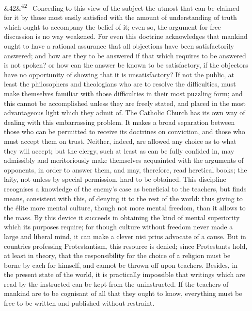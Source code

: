 \documentclass[12pt]{article}
\newcommand{\para}[1][]{\par\noindent\ifx&#1&\else\textsuperscript{\footnotesize #1}~\fi}
\begin{document}
\para[42] Conceding to this view of the subject the utmost that can be claimed for it by those most easily satisfied with the amount of understanding of truth which ought to accompany the belief of it; even so, the argument for free discussion is no way weakened. For even this doctrine acknowledges that mankind ought to have a rational assurance that all objections have been satisfactorily answered; and how are they to be answered if that which requires to be answered is not spoken? or how can the answer be known to be satisfactory, if the objectors have no opportunity of showing that it is unsatisfactory? If not the public, at least the philosophers and theologians who are to resolve the difficulties, must make themselves familiar with those difficulties in their most puzzling form; and this cannot be accomplished unless they are freely stated, and placed in the most advantageous light which they admit of. The Catholic Church has its own way of dealing with this embarrassing problem. It makes a broad separation between those who can be permitted to receive its doctrines on conviction, and those who must accept them on trust. Neither, indeed, are allowed any choice as to what they will accept; but the clergy, such at least as can be fully confided in, may admissibly and meritoriously make themselves acquainted with the arguments of opponents, in order to answer them, and may, therefore, read heretical books; the laity, not unless by special permission, hard to be obtained. This discipline recognises a knowledge of the enemy's case as beneficial to the teachers, but finds means, consistent with this, of denying it to the rest of the world: thus giving to the élite more mental culture, though not more mental freedom, than it allows to the mass. By this device it succeeds in obtaining the kind of mental superiority which its purposes require; for though culture without freedom never made a large and liberal mind, it can make a clever nisi prius advocate of a cause. But in countries professing Protestantism, this resource is denied; since Protestants hold, at least in theory, that the responsibility for the choice of a religion must be borne by each for himself, and cannot be thrown off upon teachers. Besides, in the present state of the world, it is practically impossible that writings which are read by the instructed can be kept from the uninstructed. If the teachers of mankind are to be cognisant of all that they ought to know, everything must be free to be written and published without restraint.
\end{document}
